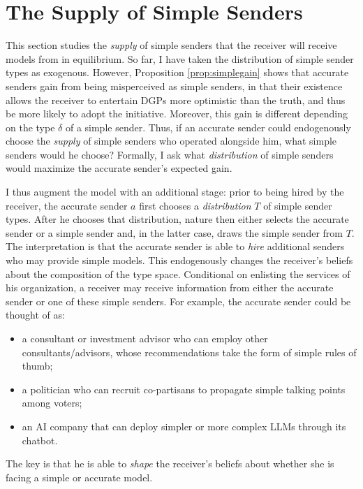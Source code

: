\documentclass[11pt,dvipsnames]{article}
\begin{document}
\section{The Supply of Simple Senders}\label{section:simple}
This section studies the \emph{supply} of simple senders that the receiver will receive models from in equilibrium.
So far, I have taken the distribution of simple sender types as exogenous.
However, Proposition \ref{prop:simplegain} shows that accurate senders gain from being misperceived as simple senders, in that their existence allows the receiver to entertain DGPs more optimistic than the truth, and thus be more likely to adopt the initiative.
Moreover, this gain is different depending on the type $\delta$ of a simple sender.
Thus, if an accurate sender could endogenously choose the \emph{supply} of simple senders who operated alongside him, what simple senders would he choose?
Formally, I ask what \emph{distribution} of simple senders would maximize the accurate sender's expected gain.

I thus augment the model with an additional stage: prior to being hired by the receiver, the accurate sender $a$ first chooses a \emph{distribution} $T$ of simple sender types.
After he chooses that distribution, nature then either selects the accurate sender or a simple sender and, in the latter case, draws the simple sender from $T$.
The interpretation is that the accurate sender is able to \emph{hire} additional senders who may provide simple models.
This endogenously changes the receiver's beliefs about the composition of the type space.
Conditional on enlisting the services of his organization, a receiver may receive information from either the accurate sender or one of these simple senders.
For example, the accurate sender could be thought of as:
\begin{itemize}
\item a consultant or investment advisor who can employ other consultants/advisors, whose recommendations take the form of simple rules of thumb;
\item a politician who can recruit co-partisans to propagate simple talking points among voters;
\item an AI company that can deploy simpler or more complex LLMs through its chatbot.
\end{itemize}
The key is that he is able to \emph{shape} the receiver's beliefs about whether she is facing a simple or accurate model.
\end{document}
